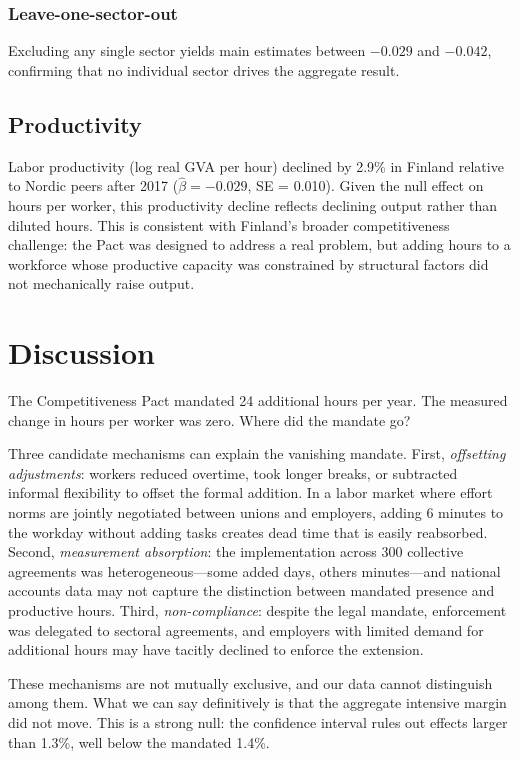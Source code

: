 \documentclass[12pt]{article}
\begin{document}


\subsubsection*{Leave-one-sector-out} Excluding any single sector yields main estimates between $-0.029$ and $-0.042$, confirming that no individual sector drives the aggregate result.


\subsection{Productivity}

Labor productivity (log real GVA per hour) declined by 2.9\% in Finland relative to Nordic peers after 2017 ($\hat{\beta} = -0.029$, SE = 0.010). Given the null effect on hours per worker, this productivity decline reflects declining output rather than diluted hours. This is consistent with Finland's broader competitiveness challenge: the Pact was designed to address a real problem, but adding hours to a workforce whose productive capacity was constrained by structural factors did not mechanically raise output.


\section{Discussion}

The Competitiveness Pact mandated 24 additional hours per year. The measured change in hours per worker was zero. Where did the mandate go?

Three candidate mechanisms can explain the vanishing mandate. First, \textit{offsetting adjustments}: workers reduced overtime, took longer breaks, or subtracted informal flexibility to offset the formal addition. In a labor market where effort norms are jointly negotiated between unions and employers, adding 6 minutes to the workday without adding tasks creates dead time that is easily reabsorbed. Second, \textit{measurement absorption}: the implementation across 300 collective agreements was heterogeneous---some added days, others minutes---and national accounts data may not capture the distinction between mandated presence and productive hours. Third, \textit{non-compliance}: despite the legal mandate, enforcement was delegated to sectoral agreements, and employers with limited demand for additional hours may have tacitly declined to enforce the extension.

These mechanisms are not mutually exclusive, and our data cannot distinguish among them. What we can say definitively is that the aggregate intensive margin did not move. This is a strong null: the confidence interval rules out effects larger than 1.3\%, well below the mandated 1.4\%.
\end{document}
